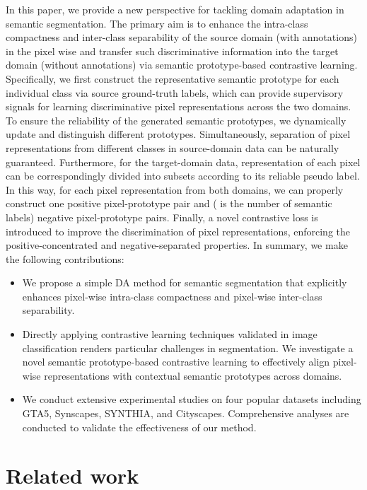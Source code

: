 \documentclass[runningheads]{llncs}
\begin{document}
In this paper, we provide a new perspective for tackling domain adaptation in semantic segmentation. The primary aim is to enhance the intra-class compactness and inter-class separability of the source domain (with annotations) in the pixel wise and transfer such discriminative information into the target domain (without annotations) via semantic prototype-based contrastive learning. Specifically, we first construct the representative semantic prototype for each individual class via source ground-truth labels, which can provide supervisory signals for learning discriminative pixel representations across the two domains. To ensure the reliability of the generated semantic prototypes, we dynamically update and distinguish different prototypes. Simultaneously, separation of pixel representations from different classes in source-domain data can be naturally guaranteed. Furthermore, for the target-domain data, representation of each pixel can be correspondingly divided into subsets according to its reliable pseudo label. In this way, for each pixel representation from both domains, we can properly construct one positive pixel-prototype pair and  ( is the number of semantic labels) negative pixel-prototype pairs. Finally, a novel contrastive loss is introduced to improve the discrimination of pixel representations, enforcing the positive-concentrated and negative-separated properties. 
In summary, we make the following contributions:\begin{itemize}
    \item We propose a simple DA method for semantic segmentation that explicitly enhances pixel-wise intra-class compactness and pixel-wise inter-class separability.
    \item Directly applying contrastive learning techniques validated in image classification renders particular challenges in segmentation. We investigate a novel semantic prototype-based contrastive learning to effectively align pixel-wise representations with contextual semantic prototypes across domains.
    \item We conduct extensive experimental studies on four popular datasets including GTA5, Synscapes, SYNTHIA, and Cityscapes. Comprehensive analyses are conducted to validate the effectiveness of our method.
\end{itemize}



\section{Related work}
\end{document}
